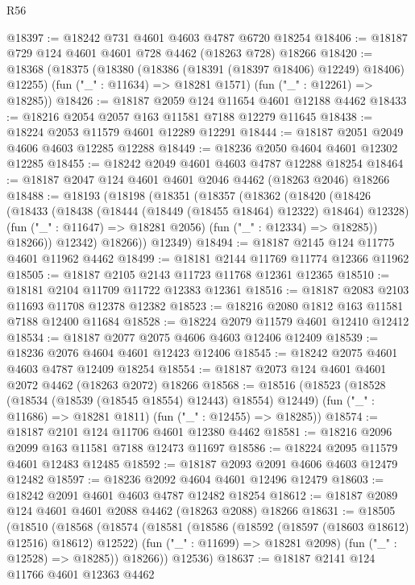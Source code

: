 \begin{lexlean}{R56}
\begin{coremodule}
@18397 := @18242 @731 @4601 @4603 @4787 @6720 @18254
@18406 := @18187 @729 @124 @4601 @4601 @728 @4462 (@18263 @728) @18266
@18420 := @18368
    (@18375
      (@18380 (@18386 (@18391 (@18397 @18406) @12249) @18406) @12255)
      (fun ("_" : @11634) => @18281 @1571)
      (fun ("_" : @12261) => @18285))
@18426 := @18187 @2059 @124 @11654 @4601 @12188 @4462
@18433 := @18216 @2054 @2057 @163 @11581 @7188 @12279 @11645
@18438 := @18224 @2053 @11579 @4601 @12289 @12291
@18444 := @18187 @2051 @2049 @4606 @4603 @12285 @12288
@18449 := @18236 @2050 @4604 @4601 @12302 @12285
@18455 := @18242 @2049 @4601 @4603 @4787 @12288 @18254
@18464 := @18187 @2047 @124 @4601 @4601 @2046 @4462 (@18263 @2046) @18266
@18488 := @18193
    (@18198
      (@18351
        (@18357
          (@18362
            (@18420
              (@18426
                (@18433
                  (@18438 (@18444 (@18449 (@18455 @18464) @12322) @18464) @12328)
                  (fun ("_" : @11647) => @18281 @2056)
                  (fun ("_" : @12334) => @18285))
                @18266))
            @12342)
          @18266))
      @12349)
@18494 := @18187 @2145 @124 @11775 @4601 @11962 @4462
@18499 := @18181 @2144 @11769 @11774 @12366 @11962
@18505 := @18187 @2105 @2143 @11723 @11768 @12361 @12365
@18510 := @18181 @2104 @11709 @11722 @12383 @12361
@18516 := @18187 @2083 @2103 @11693 @11708 @12378 @12382
@18523 := @18216 @2080 @1812 @163 @11581 @7188 @12400 @11684
@18528 := @18224 @2079 @11579 @4601 @12410 @12412
@18534 := @18187 @2077 @2075 @4606 @4603 @12406 @12409
@18539 := @18236 @2076 @4604 @4601 @12423 @12406
@18545 := @18242 @2075 @4601 @4603 @4787 @12409 @18254
@18554 := @18187 @2073 @124 @4601 @4601 @2072 @4462 (@18263 @2072) @18266
@18568 := @18516
    (@18523
      (@18528 (@18534 (@18539 (@18545 @18554) @12443) @18554) @12449)
      (fun ("_" : @11686) => @18281 @1811)
      (fun ("_" : @12455) => @18285))
@18574 := @18187 @2101 @124 @11706 @4601 @12380 @4462
@18581 := @18216 @2096 @2099 @163 @11581 @7188 @12473 @11697
@18586 := @18224 @2095 @11579 @4601 @12483 @12485
@18592 := @18187 @2093 @2091 @4606 @4603 @12479 @12482
@18597 := @18236 @2092 @4604 @4601 @12496 @12479
@18603 := @18242 @2091 @4601 @4603 @4787 @12482 @18254
@18612 := @18187 @2089 @124 @4601 @4601 @2088 @4462 (@18263 @2088) @18266
@18631 := @18505
    (@18510
      (@18568
        (@18574
          (@18581
            (@18586 (@18592 (@18597 (@18603 @18612) @12516) @18612) @12522)
            (fun ("_" : @11699) => @18281 @2098)
            (fun ("_" : @12528) => @18285))
          @18266))
      @12536)
@18637 := @18187 @2141 @124 @11766 @4601 @12363 @4462

\end{coremodule}
\end{lexlean}
